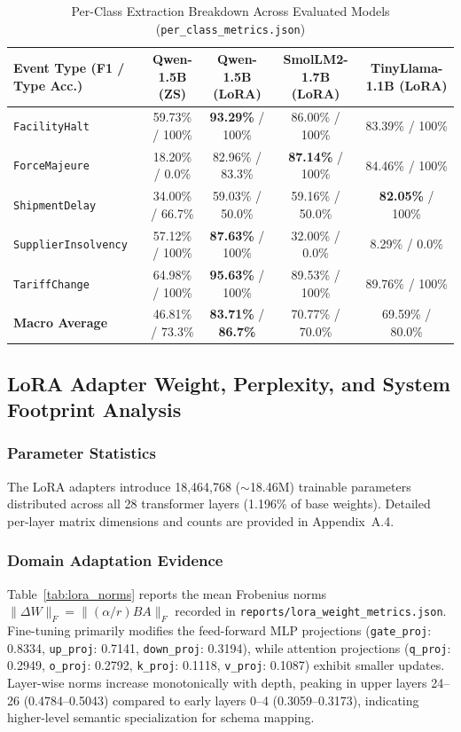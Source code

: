\documentclass[11pt,a4paper]{article}
\begin{document}
\begin{table}[htbp]
\centering
\caption{Per-Class Extraction Breakdown Across Evaluated Models (\texttt{per\_class\_metrics.json})}
\label{tab:per_class_all_models}
\small
\begin{tabular}{@{}l c c c c@{}}
\toprule
\textbf{Event Type (F1 / Type Acc.)} & \textbf{Qwen-1.5B (ZS)} & \textbf{Qwen-1.5B (LoRA)} & \textbf{SmolLM2-1.7B (LoRA)} & \textbf{TinyLlama-1.1B (LoRA)} \\
\midrule
\texttt{FacilityHalt} & 59.73\% / 100\% & \textbf{93.29\%} / 100\% & 86.00\% / 100\% & 83.39\% / 100\% \\
\texttt{ForceMajeure} & 18.20\% / 0.0\% & 82.96\% / 83.3\% & \textbf{87.14\%} / 100\% & 84.46\% / 100\% \\
\texttt{ShipmentDelay} & 34.00\% / 66.7\% & 59.03\% / 50.0\% & 59.16\% / 50.0\% & \textbf{82.05\%} / 100\% \\
\texttt{SupplierInsolvency} & 57.12\% / 100\% & \textbf{87.63\%} / 100\% & 32.00\% / 0.0\% & 8.29\% / 0.0\% \\
\texttt{TariffChange} & 64.98\% / 100\% & \textbf{95.63\%} / 100\% & 89.53\% / 100\% & 89.76\% / 100\% \\
\midrule
\textbf{Macro Average} & 46.81\% / 73.3\% & \textbf{83.71\%} / \textbf{86.7\%} & 70.77\% / 70.0\% & 69.59\% / 80.0\% \\
\bottomrule
\end{tabular}
\end{table}

\subsection{LoRA Adapter Weight, Perplexity, and System Footprint Analysis}

\subsubsection{Parameter Statistics}
The LoRA adapters introduce 18,464,768 ($\sim$18.46M) trainable parameters distributed across all 28 transformer layers (1.196\% of base weights). Detailed per-layer matrix dimensions and counts are provided in Appendix~A.4.

\subsubsection{Domain Adaptation Evidence}
Table~\ref{tab:lora_norms} reports the mean Frobenius norms $\|\Delta W\|_F = \|(\alpha/r) B A\|_F$ recorded in \texttt{reports/lora\_weight\_metrics.json}. Fine-tuning primarily modifies the feed-forward MLP projections (\texttt{gate\_proj}: 0.8334, \texttt{up\_proj}: 0.7141, \texttt{down\_proj}: 0.3194), while attention projections (\texttt{q\_proj}: 0.2949, \texttt{o\_proj}: 0.2792, \texttt{k\_proj}: 0.1118, \texttt{v\_proj}: 0.1087) exhibit smaller updates. Layer-wise norms increase monotonically with depth, peaking in upper layers 24--26 (0.4784--0.5043) compared to early layers 0--4 (0.3059--0.3173), indicating higher-level semantic specialization for schema mapping.
\end{document}
